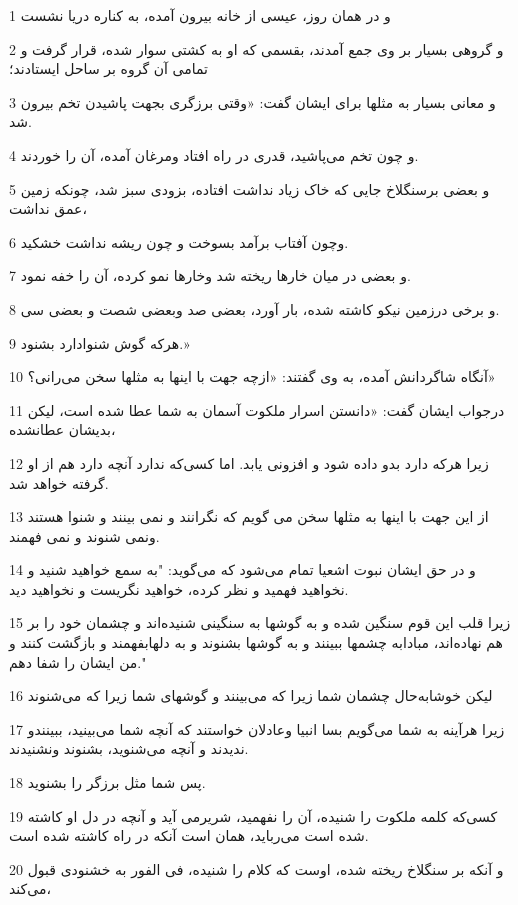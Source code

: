 \par 1 و در همان روز، عیسی از خانه بیرون آمده، به کناره دریا نشست
\par 2 و گروهی بسیار بر وی جمع آمدند، بقسمی که او به کشتی سوار شده، قرار گرفت و تمامی آن گروه بر ساحل ایستادند؛
\par 3 و معانی بسیار به مثلها برای ایشان گفت: «وقتی برزگری بجهت پاشیدن تخم بیرون شد.
\par 4 و چون تخم می‌پاشید، قدری در راه افتاد ومرغان آمده، آن را خوردند.
\par 5 و بعضی برسنگلاخ جایی که خاک زیاد نداشت افتاده، بزودی سبز شد، چونکه زمین عمق نداشت،
\par 6 وچون آفتاب برآمد بسوخت و چون ریشه نداشت خشکید.
\par 7 و بعضی در میان خارها ریخته شد وخارها نمو کرده، آن را خفه نمود.
\par 8 و برخی درزمین نیکو کاشته شده، بار آورد، بعضی صد وبعضی شصت و بعضی سی.
\par 9 هر‌که گوش شنوادارد بشنود.»
\par 10 آنگاه شاگردانش آمده، به وی گفتند: «ازچه جهت با اینها به مثلها سخن می‌رانی؟»
\par 11 درجواب ایشان گفت: «دانستن اسرار ملکوت آسمان به شما عطا شده است، لیکن بدیشان عطانشده،
\par 12 زیرا هر‌که دارد بدو داده شود و افزونی یابد. اما کسی‌که ندارد آنچه دارد هم از او گرفته خواهد شد.
\par 13 از این جهت با اینها به مثلها سخن می گویم که نگرانند و نمی بینند و شنوا هستند ونمی شنوند و نمی فهمند.
\par 14 و در حق ایشان نبوت اشعیا تمام می‌شود که می‌گوید: "به سمع خواهید شنید و نخواهید فهمید و نظر کرده، خواهید نگریست و نخواهید دید.
\par 15 زیرا قلب این قوم سنگین شده و به گوشها به سنگینی شنیده‌اند و چشمان خود را بر هم نهاده‌اند، مبادابه چشمها ببینند و به گوشها بشنوند و به دلهابفهمند و بازگشت کنند و من ایشان را شفا دهم."
\par 16 لیکن خوشابه‌حال چشمان شما زیرا که می‌بینند و گوشهای شما زیرا که می‌شنوند
\par 17 زیرا هرآینه به شما می‌گویم بسا انبیا وعادلان خواستند که آنچه شما می‌بینید، ببینندو ندیدند و آنچه می‌شنوید، بشنوند ونشنیدند.
\par 18 پس شما مثل برزگر را بشنوید.
\par 19 کسی‌که کلمه ملکوت را شنیده، آن را نفهمید، شریرمی آید و آنچه در دل او کاشته شده است می‌رباید، همان است آنکه در راه کاشته شده است.
\par 20 و آنکه بر سنگلاخ ریخته شده، اوست که کلام را شنیده، فی الفور به خشنودی قبول می‌کند،
